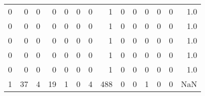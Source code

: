 \begin{tabular}{rrrrrrrrrrrrrr}
       0 &       0 &          0 &               0 &                0 &       0 &          0 &          1 &         0 &         0 &      0 &             0 &         0 &      1.0 \\
       0 &       0 &          0 &               0 &                0 &       0 &          0 &          1 &         0 &         0 &      0 &             0 &         0 &      1.0 \\
       0 &       0 &          0 &               0 &                0 &       0 &          0 &          1 &         0 &         0 &      0 &             0 &         0 &      1.0 \\
       0 &       0 &          0 &               0 &                0 &       0 &          0 &          1 &         0 &         0 &      0 &             0 &         0 &      1.0 \\
       0 &       0 &          0 &               0 &                0 &       0 &          0 &          1 &         0 &         0 &      0 &             0 &         0 &      1.0 \\
       1 &      37 &          4 &              19 &                1 &       0 &          4 &        488 &         0 &         0 &      1 &             0 &         0 &      NaN \\
\bottomrule
\end{tabular}
